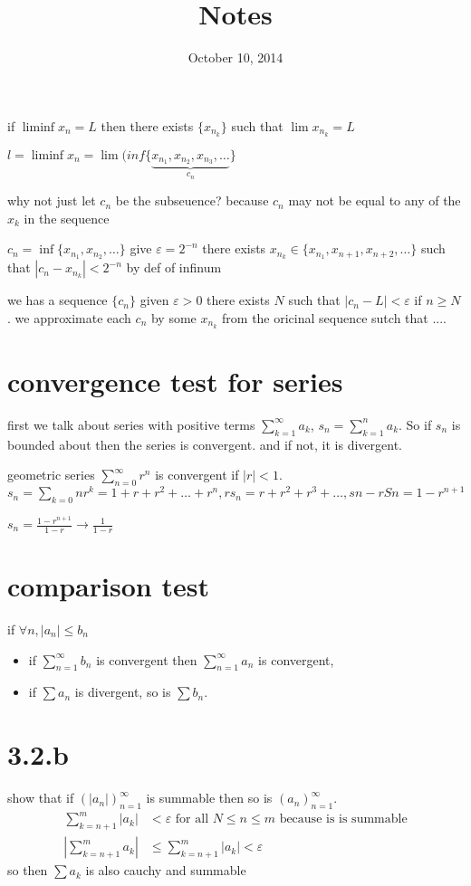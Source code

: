 \documentclass[letterpaper]{article}
\begin{document}
\title{Notes}
\date{October 10, 2014}
\maketitle
if $\liminf x_n=L$ then there exists $\{x_{n_k}\}$ such that $\lim x_{n_k}=L$

$l=\liminf x_n=\lim(inf\{\underbrace{x_{n_1},x_{n_2},x_{n_3},\dots}_{c_n}\}$

why not just let $c_n$ be the subseuence? because $c_n$ may not be equal to any of the $x_k$ in the sequence

$c_n=\inf\{x_{n_1},x_{n_2},\dots\}$ give $\varepsilon=2^{-n}$ there exists $x_{n_k}\in\{x_{n_1},x_{n+1},x_{n+2},\dots\}$ such that $\left\lvert c_n-x_{n_k}\right\rvert<2^{-n}$ by def of infinum

we has a sequence $\{c_n\}$ given $\varepsilon>0$ there exists $N$ such that $\left\lvert c_n-L\right\rvert<\varepsilon$ if $n\ge N$. we approximate each $c_n$ by some $x_{n_k}$ from the oricinal sequence sutch that ....

\section*{convergence test for series}
first we talk about series with positive terms $\sum\limits_{k=1}^\infty{a_k}$, $s_n=\sum\limits_{k=1}^n{a_k}$. So if $s_n$ is bounded about then the series is convergent. and if not, it is divergent.

geometric series $\sum\limits_{n=0}^\infty{r^n}$ is convergent if $\left\lvert r\right\rvert<1$. $s_n=\sum\limits_{k=0}n{r^k}=1+r+r^2+\dots+r^n, rs_n=r+r^2+r^3+\dots, sn-rSn=1-r^{n+1}$

$s_n=\frac{1-r^{n+1}}{1-r}\to\frac{1}{1-r}$


\section*{comparison test}
if $\forall n, |a_n|\le b_n$
\begin{itemize}
\item
  if $\sum\limits_{n=1}^\infty{b_n}$ is convergent then $\sum\limits_{n=1}^\infty{a_n}$ is convergent,
  \item
  if $\sum\limits{a_n}$ is divergent, so is $\sum\limits{b_n}$.
\end{itemize}
\section*{3.2.b}
show that if $\left(|a_n|\right)_{n=1}^\infty$ is summable then so is $\left(a_n\right)_{n=1}^\infty$.
\begin{align*}
  \sum\limits_{k=n+1}^m{|a_k|}&<\varepsilon\text{ for all }N\le n\le m \text{ because is is summable}\\
  \left\lvert\sum\limits_{k=n+1}^m{a_k}\right\rvert&\le\sum\limits_{k=n+1}^m{|a_k|}<\varepsilon
\end{align*}
so then $\sum\limits{a_k}$ is also cauchy and summable
\end{document}
